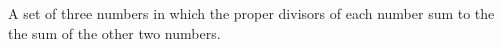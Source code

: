 A set of three numbers in which the proper divisors of each number
sum to the the sum of the other two numbers.